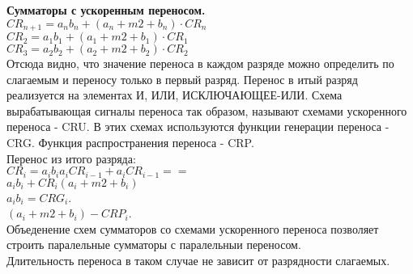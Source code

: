 \newpage
\textbf{Сумматоры с ускоренным переносом.}\\
$ CR_{n+1} = a_n b_n + (a_n +m2+ b_n) \cdot CR_n $\\
$CR_2 = a_1 b_1 + (a_1 +m2+ b_1) \cdot CR_1 $\\
$CR_3 = a_2 b_2 + (a_2 +m2+ b_2) \cdot CR_2 $\\
Отсюда видно, что значение переноса в каждом разряде можно определить по слагаемым и переносу только в первый разряд.
Перенос в итый разряд реализуется на элементах И, ИЛИ, ИСКЛЮЧАЮЩЕЕ-ИЛИ.
Схема вырабатывающая сигналы переноса так образом, называют схемами ускоренного переноса - CRU.
В этих схемах используются функции генерации переноса - CRG. Функция распространения переноса - CRP.\\
Перенос из итого разряда:\\
$CR_i = a_i b_i  a_i CR_{i-1} +a_i CR_{i-1} ==$\\
$a_i b_i + CR_i (a_i +m2+ b_i)$\\
$a_i b_i = CRG_i$.\\
$ (a_i +m2+ b_i) - CRP_i$.\\
Объеденение схем сумматоров со схемами ускоренного переноса позволяет строить паралельные сумматоры с паралельныи переносом.\\
Длительность переноса в таком случае не зависит от разрядности слагаемых.\\
